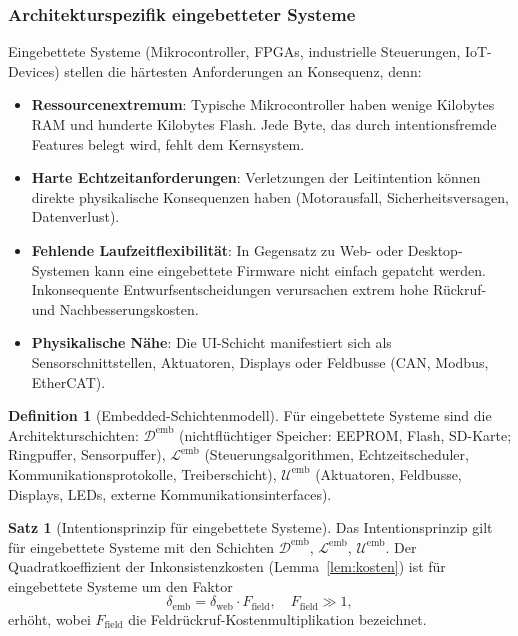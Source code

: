 ﻿\documentclass[a4paper,12pt]{article}
\theoremstyle{definition}
\newtheorem{definition}{Definition}
\newtheorem{satz}{Satz}
\begin{document}
\subsubsection{Architekturspezifik eingebetteter Systeme}

Eingebettete Systeme (Mikrocontroller, FPGAs, industrielle Steuerungen,
IoT-Devices) stellen die härtesten Anforderungen an Konsequenz, denn:

\begin{itemize}
    \item \textbf{Ressourcenextremum}: Typische Mikrocontroller haben
          wenige Kilobytes RAM und hunderte Kilobytes Flash. Jede Byte,
          das durch intentionsfremde Features belegt wird, fehlt dem
          Kernsystem.
    \item \textbf{Harte Echtzeitanforderungen}: Verletzungen der
          Leitintention können direkte physikalische Konsequenzen haben
          (Motorausfall, Sicherheitsversagen, Datenverlust).
    \item \textbf{Fehlende Laufzeitflexibilität}: In Gegensatz zu Web-
          oder Desktop-Systemen kann eine eingebettete Firmware nicht
          einfach gepatcht werden. Inkonsequente Entwurfsentscheidungen
          verursachen extrem hohe Rückruf- und Nachbesserungskosten.
    \item \textbf{Physikalische Nähe}: Die UI-Schicht manifestiert sich
          als Sensorschnittstellen, Aktuatoren, Displays oder Feldbusse
          (CAN, Modbus, EtherCAT).
\end{itemize}

\begin{definition}[Embedded-Schichtenmodell]
Für eingebettete Systeme sind die Architekturschichten:
$\mathcal{D}^{\text{emb}}$ (nichtflüchtiger Speicher: EEPROM, Flash,
SD-Karte; Ringpuffer, Sensorpuffer),
$\mathcal{L}^{\text{emb}}$ (Steuerungsalgorithmen, Echtzeitscheduler,
Kommunikationsprotokolle, Treiberschicht),
$\mathcal{U}^{\text{emb}}$ (Aktuatoren, Feldbusse, Displays, LEDs,
externe Kommunikationsinterfaces).
\end{definition}

\begin{satz}[Intentionsprinzip für eingebettete Systeme]\label{satz:embedded}
Das Intentionsprinzip gilt für eingebettete Systeme mit den Schichten
$\mathcal{D}^{\text{emb}}$, $\mathcal{L}^{\text{emb}}$,
$\mathcal{U}^{\text{emb}}$. Der Quadratkoeffizient der Inkonsistenzkosten
(Lemma~\ref{lem:kosten}) ist für eingebettete Systeme um den Faktor
\[
\delta_{\text{emb}} = \delta_{\text{web}} \cdot F_{\text{field}},
\quad F_{\text{field}} \gg 1,
\]
erhöht, wobei $F_{\text{field}}$ die Feldrückruf-Kostenmultiplikation
bezeichnet.
\end{satz}
\end{document}
